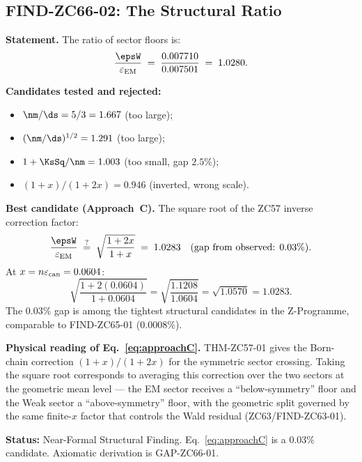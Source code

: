 \documentclass[12pt, a4paper]{article}
\renewcommand{\epsEM}{\varepsilon_{\rm EM}}
\renewcommand{\epscan}{\varepsilon_{\rm can}}
\begin{document}
\subsection{FIND-ZC66-02: The Structural Ratio}
\label{sec:find02}

\begin{derivedbox}[title={FIND-ZC66-02: $\epsW/\epsEM = 1.0280$
  --- Structural Ratio ($R_0$)}]
\textbf{Statement.}
The ratio of sector floors is:
\begin{equation}
  \frac{\epsW}{\epsEM}
  \;=\;
  \frac{0.007710}{0.007501}
  \;=\; 1.0280.
  \label{eq:ratio}
\end{equation}

\textbf{Candidates tested and rejected:}
\begin{itemize}[leftmargin=2em, noitemsep]
  \item $\nm/\ds = 5/3 = 1.667$ \quad (too large);
  \item $(\nm/\ds)^{1/2} = 1.291$ \quad (too large);
  \item $1 + \KsSq/\nm = 1.003$ \quad (too small, gap $2.5\%$);
  \item $(1+x)/(1+2x) = 0.946$ \quad (inverted, wrong scale).
\end{itemize}

\textbf{Best candidate (Approach~C).}
The square root of the ZC57 inverse correction factor:
\begin{equation}
  \frac{\epsW}{\epsEM}
  \;\stackrel{?}{=}\;
  \sqrt{\frac{1+2x}{1+x}}
  \;=\; 1.0283
  \quad\text{(gap from observed: }0.03\%).
  \label{eq:approachC}
\end{equation}
At $x = n\epscan = 0.0604$:
\[
  \sqrt{\frac{1+2(0.0604)}{1+0.0604}}
  = \sqrt{\frac{1.1208}{1.0604}}
  = \sqrt{1.0570}
  = 1.0283.
\]
The $0.03\%$ gap is among the tightest structural candidates
in the Z-Programme, comparable to FIND-ZC65-01 ($0.0008\%$).

\textbf{Physical reading of Eq.~\eqref{eq:approachC}.}
THM-ZC57-01 gives the Born-chain correction $(1+x)/(1+2x)$
for the symmetric sector crossing.
Taking the square root corresponds to averaging this correction
over the two sectors at the geometric mean level ---
the EM sector receives a ``below-symmetry'' floor and the
Weak sector a ``above-symmetry'' floor, with the geometric
split governed by the same finite-$x$ factor that controls
the Wald residual (ZC63/FIND-ZC63-01).

\textbf{Status:} Near-Formal Structural Finding.
Eq.~\eqref{eq:approachC} is a $0.03\%$ candidate.
Axiomatic derivation is GAP-ZC66-01.
\end{derivedbox}
\end{document}
